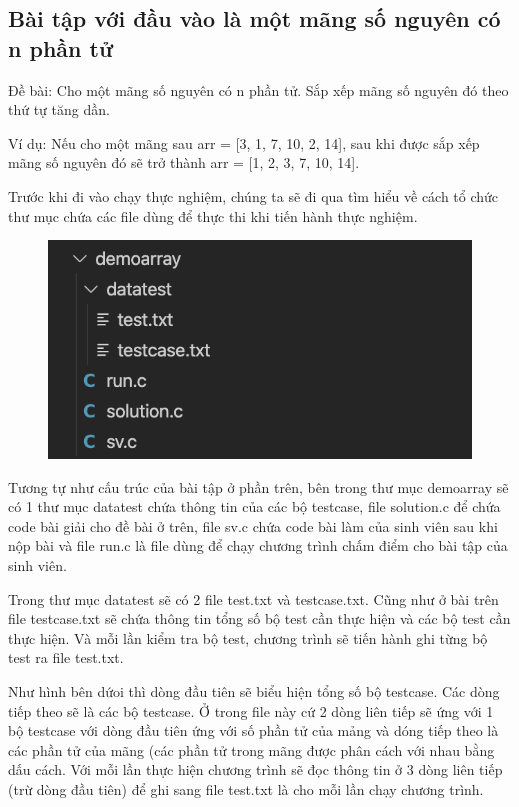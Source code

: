 \documentclass[12pt,a4paper]{article}
\begin{document}
\subsection{Bài tập với đầu vào là một mãng số nguyên có n phần tử}

Đề bài: Cho một mãng số nguyên có n phần tử. Sắp xếp mãng số nguyên đó theo thứ tự tăng dần.

Ví dụ: Nếu cho một mãng sau arr = [3, 1, 7, 10, 2, 14], sau khi được sắp xếp mãng số nguyên đó sẽ trở thành arr = [1, 2, 3, 7, 10, 14].

Trước khi đi vào chạy thực nghiệm, chúng ta sẽ đi qua tìm hiểu về cách tổ chức thư mục chứa các file dùng để thực thi khi tiến hành thực nghiệm.

\begin{figure}[ht]
\begin{center}
\includegraphics[scale=.3]{hinhanh/cautrucdemoarray.png}
\end{center}
\end{figure}

Tương tự như cấu trúc của bài tập ở phần trên, bên trong thư mục demoarray sẽ có 1 thư mục datatest chứa thông tin của các bộ testcase, file solution.c để chứa code bài giải cho đề bài ở trên, file sv.c chứa code bài làm của sinh viên sau khi nộp bài và file run.c là file dùng để chạy chương trình chấm điểm cho bài tập của sinh viên.

Trong thư mục datatest sẽ có 2 file test.txt và testcase.txt. Cũng như ở bài trên file testcase.txt sẽ chứa thông tin tổng số bộ test cần thực hiện và các bộ test cần thực hiện. Và mỗi lần kiểm tra bộ test, chương trình sẽ tiến hành ghi từng bộ test ra file test.txt.

Như hình bên dứoi thì dòng đầu tiên sẽ biểu hiện tổng số bộ testcase. Các dòng tiếp theo sẽ là các bộ testcase. Ở trong file này cứ 2 dòng liên tiếp sẽ ứng với 1 bộ testcase với dòng đầu tiên ứng với số phần tử của mảng và dóng tiếp theo là các phần tử của mãng (các phần tử trong mãng được phân cách với nhau bằng dấu cách. Với mỗi lần thực hiện chương trình sẽ đọc thông tin ở 3 dòng liên tiếp (trừ dòng đầu tiên) để ghi sang file test.txt là cho mỗi lần chạy chương trình.
\end{document}

